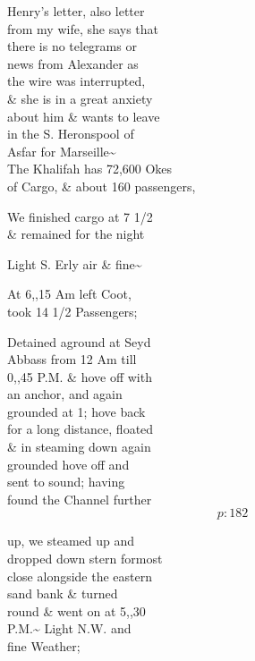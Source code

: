 \documentclass{report}
\begin{document}
	\par{
 	Henry's letter, also letter\ \\from my wife, she says that\ \\there is no telegrams or\ \\news from Alexander as\ \\the wire was interrupted,\ \\\& she is in a great anxiety\ \\about him \& wants to leave\ \\in the S. Heronspool of\ \\Asfar for Marseille\~{}\ \\The Khalifah has 72,600 Okes\ \\of Cargo, \& about 160 passengers,\ \\
	}

	\par{
 	We finished cargo at 7 1/2\ \\\& remained for the night\ \\
	}

	\par{
 	Light S. Erly air \& fine\~{}\ \\
	}

	\par{
 	At 6,,15 Am left Coot,\ \\took 14 1/2 Passengers;\ \\
	}

	\par{
 	Detained aground at Seyd\ \\Abbass from 12 Am till\ \\0,,45 P.M. \& hove off with\ \\an anchor, and again\ \\grounded at 1; hove back\ \\for a long distance, floated\ \\\& in steaming down again\ \\grounded hove off and\ \\sent to sound; having\ \\found the Channel further\ \\
  \[p: 182 \]

	}

	\par{
 	up, we steamed up and\ \\dropped down stern formost\ \\close alongside the eastern\ \\sand bank \& turned\ \\round \& went on at 5,,30\ \\P.M.\~{} Light N.W. and\ \\fine Weather;\ \\
	}
\end{document}
